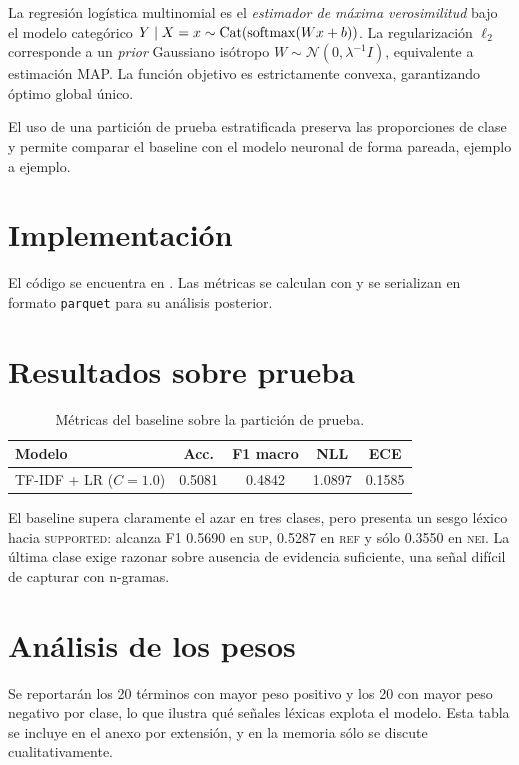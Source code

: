 La regresión logística multinomial es el \emph{estimador de máxima
verosimilitud} bajo el modelo categórico
$Y \mid X = x \sim \mathrm{Cat}(\operatorname{softmax}(W x + b))$. La regularización
$\ell_2$ corresponde a un \emph{prior} Gaussiano isótropo
$W \sim \mathcal{N}(0, \lambda^{-1} I)$, equivalente a estimación MAP.
La función objetivo es estrictamente convexa, garantizando óptimo
global único.

El uso de una partición de prueba estratificada preserva las
proporciones de clase y permite comparar el baseline con el modelo
neuronal de forma pareada, ejemplo a ejemplo.

\section{Implementación}

El código se encuentra en
. Las
métricas se calculan con  y
se serializan en formato \texttt{parquet} para su análisis posterior.

\section{Resultados sobre prueba}

\begin{table}[h]
  \centering
  \begin{tabular}{lcccc}
    \toprule
    Modelo & Acc. & F1 macro & NLL & ECE \\
    \midrule
    TF-IDF + LR ($C = 1.0$) & 0.5081 & 0.4842 & 1.0897 & 0.1585 \\
    \bottomrule
  \end{tabular}
  \caption{Métricas del baseline sobre la partición de prueba.}
  \label{tab:baseline}
\end{table}

El baseline supera claramente el azar en tres clases, pero presenta un
sesgo léxico hacia \textsc{supported}: alcanza F1 0.5690 en
\textsc{sup}, 0.5287 en \textsc{ref} y sólo 0.3550 en \textsc{nei}. La
última clase exige razonar sobre ausencia de evidencia suficiente, una
señal difícil de capturar con n-gramas.

\section{Análisis de los pesos}

Se reportarán los 20 términos con mayor peso positivo y los 20 con
mayor peso negativo por clase, lo que ilustra qué señales léxicas
explota el modelo. Esta tabla se incluye en el anexo por extensión, y
en la memoria sólo se discute cualitativamente.
